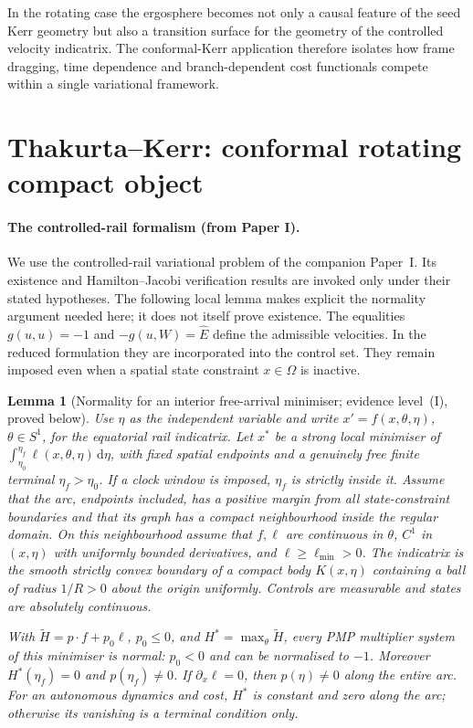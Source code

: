 \documentclass[12pt]{iopart}
\theoremstyle{plain}
\newtheorem{lemma}[proposition]{Lemma}
\theoremstyle{definition}
\theoremstyle{remark}
\newcommand{\Ehat}{\hat E}
\newcommand{\dd}{\mathrm{d}}
\begin{document}
In the rotating case the ergosphere becomes not only a causal feature of the seed Kerr
geometry but also a transition surface for the geometry of the controlled velocity
indicatrix. The conformal-Kerr application therefore isolates how frame dragging, time
dependence and branch-dependent cost functionals compete within a single variational
framework.

\section{Thakurta--Kerr: conformal rotating compact object}
\label{sec:thakurta}
\paragraph{The controlled-rail formalism (from Paper I).}
We use the controlled-rail variational problem of the companion Paper~I.
Its existence and Hamilton--Jacobi verification results are invoked only
under their stated hypotheses. The following local lemma makes explicit
the normality argument needed here; it does not itself prove existence.
The equalities $g(u,u)=-1$ and $-g(u,W)=\Ehat$ define the admissible
velocities. In the reduced formulation they are incorporated into the
control set. They remain imposed even when a spatial state constraint
$x\in\Omega$ is inactive.

\begin{lemma}[Normality for an interior free-arrival minimiser; evidence level~(I), proved below]
\label{lem:normality}
Use $\eta$ as the independent variable and write
$x'=f(x,\theta,\eta)$, $\theta\in S^1$, for the equatorial rail
indicatrix. Let $x^\ast$ be a strong local minimiser of
$\int_{\eta_0}^{\eta_f}\ell(x,\theta,\eta)\,\dd\eta$, with fixed
spatial endpoints and a genuinely free finite terminal $\eta_f>\eta_0$.
If a clock window is imposed, $\eta_f$ is strictly inside it.
Assume that the arc, endpoints included, has a positive margin from
all state-constraint boundaries and that its graph has a compact
neighbourhood inside the regular domain. On this neighbourhood assume
that $f,\ell$ are continuous in $\theta$, $C^1$ in $(x,\eta)$ with
uniformly bounded derivatives, and $\ell\ge\ell_{\min}>0$.
The indicatrix is the smooth strictly convex boundary of a compact
body $K(x,\eta)$ containing a ball of radius $1/R>0$ about the origin
uniformly. Controls are measurable and states are absolutely continuous.

With $\widetilde H=p\cdot f+p_0\ell$, $p_0\le0$, and
$H^\ast=\max_\theta\widetilde H$, every PMP multiplier system of
this minimiser is normal: $p_0<0$ and can be normalised to $-1$.
Moreover $H^\ast(\eta_f)=0$ and $p(\eta_f)\ne0$.
If $\partial_x\ell=0$, then $p(\eta)\ne0$ along the entire arc.
For an autonomous dynamics and cost, $H^\ast$ is constant and zero
along the arc; otherwise its vanishing is a terminal condition only.
\end{lemma}
\end{document}
